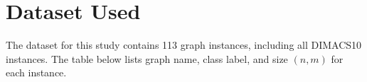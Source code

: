 \documentclass[11pt]{article}
\begin{document}



\section{Dataset Used}
The dataset for this study contains 113 graph instances, including all DIMACS10 instances. The table below lists graph name, class label, and size $(n,m)$ for each instance.

\begingroup
\small

\endgroup
\end{document}
